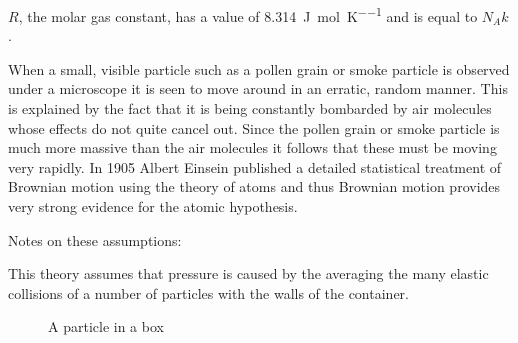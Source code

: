 \documentclass[main.tex]{subfiles}
\begin{document}
$R$, the molar gas constant, has a value of \SI{8.314}{\joule\per\mole\per\kelvin} and is equal to $N_A k$.


When a small, visible particle such as a pollen grain or smoke particle is observed under a microscope it is seen to move around in an erratic, random manner. This is explained by the fact that it is being constantly bombarded by air molecules whose effects do not quite cancel out. Since the pollen grain or smoke particle is much more massive than the air molecules it follows that these must be moving very rapidly. In 1905 Albert Einsein published a detailed statistical treatment of Brownian motion using the theory of atoms and thus Brownian motion provides very strong evidence for the atomic hypothesis.


Notes on these assumptions:






This theory assumes that pressure is caused by the averaging the many elastic collisions of a number of particles with the walls of the container.

\begin{figure}[ht]
    \begin{center}\end{center}
    \caption{A particle in a box}
\end{figure}
\end{document}
